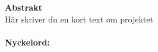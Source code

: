 \textbf {\large{Abstrakt}}\\

H\"{a}r skriver du en kort text om projektet\\\\






\textbf{Nyckelord:}
